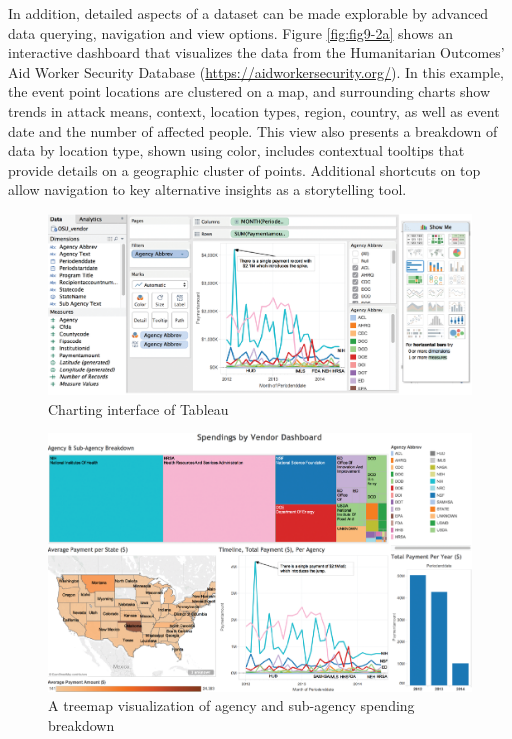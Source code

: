 \documentclass[]{krantz}
\begin{document}
In addition, detailed aspects of a dataset can be made explorable by
advanced data querying, navigation and view options. Figure
\ref{fig:fig9-2a} shows an interactive dashboard that visualizes the
data from the Humanitarian Outcomes' Aid Worker Security Database
(\url{https://aidworkersecurity.org/}). In this example, the event point
locations are clustered on a map, and surrounding charts show trends in
attack means, context, location types, region, country, as well as event
date and the number of affected people. This view also presents a
breakdown of data by location type, shown using color, includes
contextual tooltips that provide details on a geographic cluster of
points. Additional shortcuts on top allow navigation to key alternative
insights as a storytelling tool.

\begin{figure}

{\centering \includegraphics[width=0.9\linewidth]{ChapterViz/figures/fig9-3a} 

}

\caption{Charting interface of Tableau}\label{fig:fig9-3a}
\end{figure}

\begin{figure}

{\centering \includegraphics[width=0.9\linewidth]{ChapterViz/figures/fig9-3b} 

}

\caption{A treemap visualization of agency and sub-agency spending breakdown}\label{fig:fig9-3b}
\end{figure}
\end{document}
